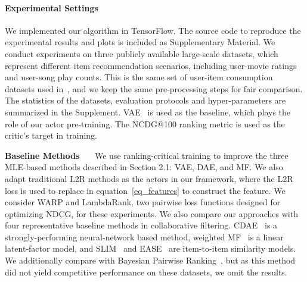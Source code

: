 \documentclass{article} \usepackage{iclr2020_conference,times}
\def\eqref#1{equation~\ref{#1}}
\begin{document}
\paragraph{Experimental Settings} 
We implemented our algorithm in TensorFlow. The source code to reproduce the experimental results and plots is included as Supplementary Material. We conduct experiments on three publicly available
large-scale datasets, which represent different item recommendation scenarios, including user-movie ratings and user-song play counts. This is the same set of user-item consumption datasets used in~\citet{liang2018variational}, and we keep the same pre-processing steps for fair comparison. 
The statistics of the datasets, evaluation protocols and hyper-parameters are summarized in the Supplement. 
VAE~\citep{liang2018variational} is used as the baseline, which plays the role of our actor pre-training. The NCDG@100 ranking metric is used as the critic's target in training. 



























{\bf Baseline Methods}~~~
We use ranking-critical training to improve the three MLE-based methods described in Section 2.1: VAE, DAE, and MF. We also adapt traditional L2R methods as the actors in our framework, where the L2R loss is used to replace  in \eqref{eq_features} to construct the feature. We consider WARP and LambdaRank, two pairwise loss functions designed for optimizing NDCG, for these experiments. We also compare our approaches with four representative baseline methods in collaborative filtering. CDAE~\citep{wu2016collaborative} is a strongly-performing neural-network based method, weighted MF~\citep{hu2008collaborative} is a linear latent-factor model, and SLIM~\citep{ning2011slim} and EASE~\citep{steck2019ease} are item-to-item similarity models. We additionally compare with Bayesian Pairwise Ranking~\citep{rendle2009bpr}, but as this method did not yield competitive performance on these datasets, we omit the results.
\end{document}
